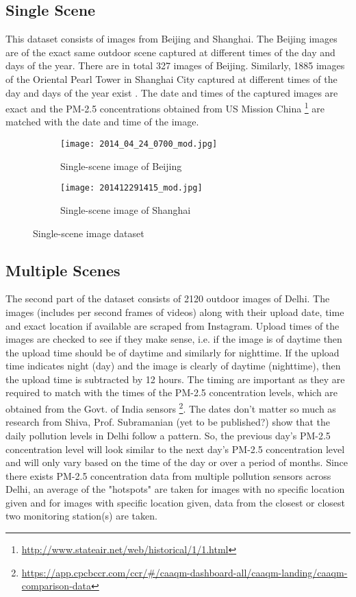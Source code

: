 \documentclass{article}
\begin{document}
\subsection{Single Scene}
This dataset consists of images from Beijing and Shanghai. The Beijing images are of the exact same outdoor scene captured at different times of the day and days of the year. There are in total 327 images of Beijing. Similarly, 1885 images of the Oriental Pearl Tower in Shanghai City captured at different times of the day and days of the year exist \cite{PP}. The date and times of the captured images are exact and the PM-2.5 concentrations obtained from US Mission China \footnote{\url{http://www.stateair.net/web/historical/1/1.html}} are matched with the date and time of the image.

\begin{figure}[H]
\centering
\begin{subfigure}{.5\textwidth}
  \centering
  \texttt{[image: 2014\_04\_24\_0700\_mod.jpg]}
  \caption{Single-scene image of Beijing}
\end{subfigure}%
\begin{subfigure}{.5\textwidth}
  \centering
  \texttt{[image: 201412291415\_mod.jpg]}
  \caption{Single-scene image of Shanghai}
\end{subfigure}
\caption{Single-scene image dataset}
\label{Single-scene image dataset}
\end{figure}

\subsection{Multiple Scenes}
The second part of the dataset consists of 2120 outdoor images of Delhi. The images (includes per second frames of videos) along with their upload date, time and exact location if available are scraped from Instagram. Upload times of the images are checked to see if they make sense, i.e. if the image is of daytime then the upload time should be of daytime and similarly for nighttime. If the upload time indicates night (day) and the image is clearly of daytime (nighttime), then the upload time is subtracted by 12 hours. The timing are important as they are required to match with the times of the PM-2.5 concentration levels, which are obtained from the  Govt. of India sensors \footnote{\url{https://app.cpcbccr.com/ccr/#/caaqm-dashboard-all/caaqm-landing/caaqm-comparison-data}}. The dates don't matter so much as research from Shiva, Prof. Subramanian (yet to be published?) show that the daily pollution levels in Delhi follow a pattern. So, the previous day's PM-2.5 concentration level will look similar to the next day's PM-2.5 concentration level and will only vary based on the time of the day or over a period of months. Since there exists PM-2.5 concentration data from multiple pollution sensors across Delhi, an average of the "hotspots" are taken for images with no specific location given and for images with specific location given, data from the closest or closest two monitoring station(s) are taken.
\end{document}
